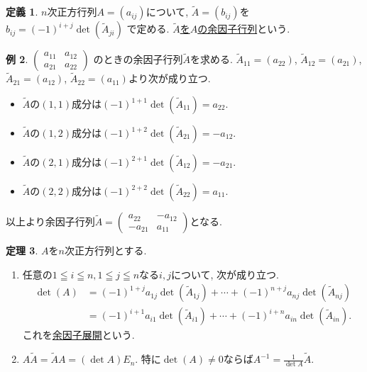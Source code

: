 \documentclass[dvipdfmx,a4paper,11pt]{article}
\theoremstyle{definition}
\newtheorem{thm}{定理}
\newtheorem{dfn}[thm]{定義}
\newtheorem{exa}[thm]{例}
\begin{document}
\begin{tcolorbox}[
    colback = white,
    colframe = green!35!black,
    fonttitle = \bfseries,
    breakable = true]
    \begin{dfn}
    $n$次正方行列$A=(a_{ij})$について, $\tilde{A} =(b_{ij})$を
    \underline{$
    b_{ij} = (-1)^{i+j} \det(\tilde{A}_{ji})$}
    で定める.
 \underline{$\tilde{A}$を$A$の余因子行列}という.
    \end{dfn}
 \end{tcolorbox}
\begin{exa}
\label{inverse_2}
$
\begin{pmatrix}
a_{11} & a_{12} \\
a_{21} & a_{22}
\end{pmatrix}
$
のときの余因子行列$\tilde{A} $を求める.
$  \tilde{A}_{11} =(a_{22})$, $  \tilde{A}_{12} =(a_{21})$, $  \tilde{A}_{21} =(a_{12})$, $  \tilde{A}_{22} =(a_{11})$より次が成り立つ.
\begin{itemize}
  \setlength{\parskip}{0cm} 
  \setlength{\itemsep}{0cm}
\item $\tilde{A} $の$(1,1)$成分は$(-1)^{1+1}\det( \tilde{A}_{11}) = a_{22}$.
\item $\tilde{A} $の$(1,2)$成分は$(-1)^{1+2}\det( \tilde{A}_{21}) = -a_{12}$.
\item $\tilde{A} $の$(2,1)$成分は$(-1)^{2+1}\det( \tilde{A}_{12}) = -a_{21}$.
\item $\tilde{A} $の$(2,2)$成分は$(-1)^{2+2}\det( \tilde{A}_{22}) = a_{11}$.
\end{itemize}
以上より余因子行列$\tilde{A} = 
\begin{pmatrix}
a_{22} &- a_{12} \\
-a_{21} & a_{11}
\end{pmatrix}$となる.
\end{exa}


\begin{tcolorbox}[
    colback = white,
    colframe = green!35!black,
    fonttitle = \bfseries,
    breakable = true]
    \begin{thm}
 $A$を$n$次正方行列とする.
 \begin{enumerate}
\item %
任意の$1 \leqq i \leqq n, 1 \leqq j\leqq n$なる$i,j$について, 次が成り立つ.
 \begin{align*}
 \det(A) & =(-1)^{1+j}a_{1j}\det(\tilde{A}_{1j}) + \cdots +(-1)^{n+j}a_{nj}\det(\tilde{A}_{nj}) 
 \\
 &=(-1)^{i+1}a_{i1}\det(\tilde{A}_{i1}) + \cdots +(-1)^{i+n}a_{in}\det(\tilde{A}_{in}).
  \end{align*}
  これを\underline{余因子展開}という.
 \item $A\tilde{A} = \tilde{A}A =(\det A)E_n$. 特に$\det(A)\neq0$ならば$A^{-1} = \frac{1}{\det A} \tilde{A}$.
 \end{enumerate}
     \end{thm}
 \end{tcolorbox}
\end{document}
